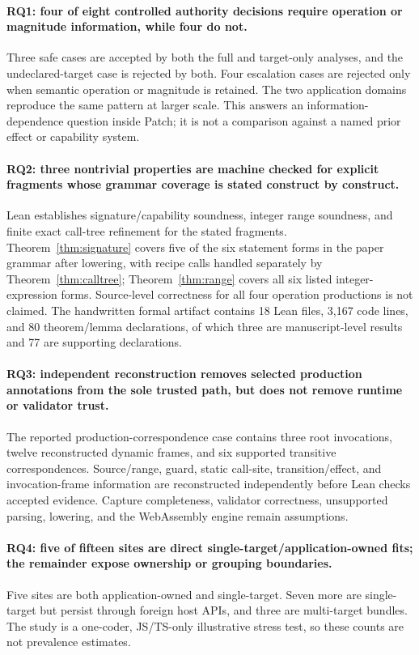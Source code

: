 \documentclass[10pt]{article}
\theoremstyle{plain}
\theoremstyle{remark}
\begin{document}
\paragraph{RQ1: four of eight controlled authority decisions require operation or magnitude information, while four do not.}
Three safe cases are accepted by both the full and target-only analyses, and the undeclared-target case is rejected by both. Four escalation cases are rejected only when semantic operation or magnitude is retained. The two application domains reproduce the same pattern at larger scale. This answers an information-dependence question inside Patch; it is not a comparison against a named prior effect or capability system.

\paragraph{RQ2: three nontrivial properties are machine checked for explicit fragments whose grammar coverage is stated construct by construct.}
Lean establishes signature/capability soundness, integer range soundness, and finite exact call-tree refinement for the stated fragments. Theorem~\ref{thm:signature} covers five of the six statement forms in the paper grammar after lowering, with recipe calls handled separately by Theorem~\ref{thm:calltree}; Theorem~\ref{thm:range} covers all six listed integer-expression forms. Source-level correctness for all four operation productions is not claimed. The handwritten formal artifact contains 18 Lean files, 3,167 code lines, and 80 theorem/lemma declarations, of which three are manuscript-level results and 77 are supporting declarations.

\paragraph{RQ3: independent reconstruction removes selected production annotations from the sole trusted path, but does not remove runtime or validator trust.}
The reported production-correspondence case contains three root invocations, twelve reconstructed dynamic frames, and six supported transitive correspondences. Source/range, guard, static call-site, transition/effect, and invocation-frame information are reconstructed independently before Lean checks accepted evidence. Capture completeness, validator correctness, unsupported parsing, lowering, and the WebAssembly engine remain assumptions.

\paragraph{RQ4: five of fifteen sites are direct single-target/application-owned fits; the remainder expose ownership or grouping boundaries.}
Five sites are both application-owned and single-target. Seven more are single-target but persist through foreign host APIs, and three are multi-target bundles. The study is a one-coder, JS/TS-only illustrative stress test, so these counts are not prevalence estimates.
\end{document}
